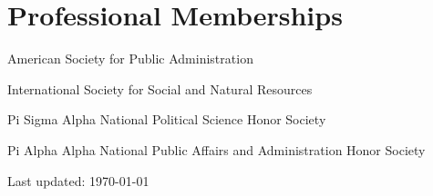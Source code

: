 \documentclass[11pt,letterpaper]{article}
\renewenvironment{itemize}{
  \begin{list}{}{
    \setlength{\leftmargin}{1.5em}
    \setlength{\itemsep}{0.25em}
    \setlength{\parskip}{0pt}
    \setlength{\parsep}{0.25em}
  }
}{
  \end{list}
}
\newcommand\tagpdfsetup[1]{}
\begin{document}
\section*{Professional Memberships}
\begin{itemize}\leftmargin=2pt\itemindent=-15pt
  \item American Society for Public Administration
  \item International Society for Social and Natural Resources
  \item Pi Sigma Alpha National Political Science Honor Society
  \item Pi Alpha Alpha National Public Affairs and Administration Honor Society
\end{itemize}

	
  \tagpdfsetup{activate-all=true, interwordspace=true}
\vspace{1em}
\begin{center}
  \begin{small}
    Last updated: \today
      \end{small}
\end{center}
\end{document}
